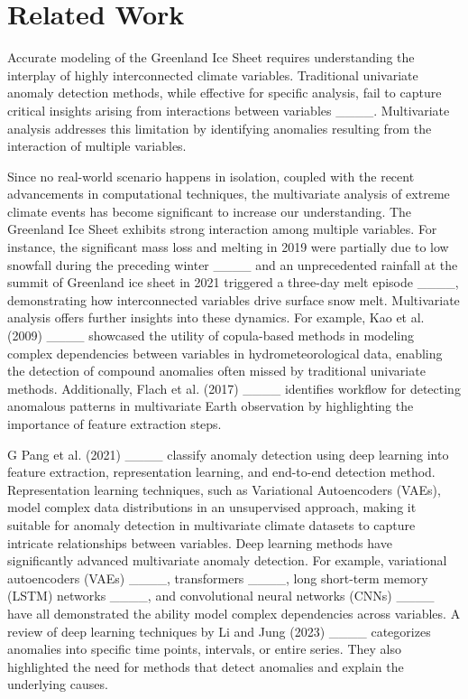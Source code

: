 \section{Related Work}
Accurate modeling of the Greenland Ice Sheet requires understanding the interplay of highly interconnected climate variables. Traditional univariate anomaly detection methods, while effective for specific analysis, fail to capture critical insights arising from interactions between variables ____. Multivariate analysis addresses this limitation by identifying anomalies resulting from the interaction of multiple variables.

Since no real-world scenario happens in isolation, coupled with the recent advancements in computational techniques, the multivariate analysis of extreme climate events has become significant to increase our understanding. The Greenland Ice Sheet exhibits strong interaction among multiple variables. For instance, the significant mass loss and melting in 2019 were partially due to low snowfall during the preceding winter ____ and an unprecedented rainfall at the summit of Greenland ice sheet in 2021 triggered a three-day melt episode ____, demonstrating how interconnected variables drive surface snow melt. Multivariate analysis offers further insights into these dynamics. For example, Kao et al. (2009) ____ showcased the utility of copula-based methods in modeling complex dependencies between variables in hydrometeorological data, enabling the detection of compound anomalies often missed by traditional univariate methods. Additionally, Flach et al. (2017) ____ identifies workflow for detecting anomalous patterns in multivariate Earth observation by highlighting the importance of feature extraction steps.  

G Pang et al. (2021) ____ classify anomaly detection using deep learning into feature extraction, representation learning, and end-to-end detection method. Representation learning techniques, such as Variational Autoencoders (VAEs), model complex data distributions in an unsupervised approach, making it suitable for anomaly detection in multivariate climate datasets to capture intricate relationships between variables.
Deep learning methods have significantly advanced multivariate anomaly detection. For example, variational autoencoders (VAEs) ____, transformers ____, long short-term memory (LSTM) networks ____, and convolutional neural networks (CNNs) ____ have all demonstrated the ability model complex dependencies across variables. A review of deep learning techniques by Li and Jung (2023) ____ categorizes anomalies into specific time points, intervals, or entire series. They also highlighted the need for methods that detect anomalies and explain the underlying causes.

